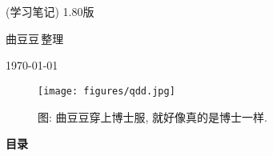 \documentclass[12pt, b5paper]{article}   %
\begin{document}
\begin{center}

\,

\vspace{8pt}

{\fontsize{60pt}{\baselineskip}\selectfont{\yankai\ykai 辛几何初步}\\

\vspace{12pt}

{(学习笔记)} {1.80版}}
\vspace{15pt}

{\kaishu 曲豆豆\,整理\\
\vspace{2pt}
{
}
}\vspace{10pt}

{ \today}%
\vspace{60pt}


\begin{figure}[H]
  \centering
  \texttt{[image: figures/qdd.jpg]}

  图: 曲豆豆穿上博士服, 就好像真的是博士一样.
\end{figure}

\end{center}

\newpage


\newcommand*{\kshh}{\vspace{10pt}}  %
\newcommand*{\xczi}[1]
  {
    {\zihao{6} #1}
  }                  %



\newpage

\begin{center}
\textbf{{\fontsize{20pt}{\baselineskip}\selectfont\yankai 目录}}
\end{center}

\tableofcontents

\newpage

\newpage
\end{document}
